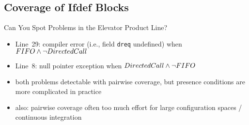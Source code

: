 \subsection{Coverage of Ifdef Blocks}
\begin{frame}[b]
	\begin{example}{Can You Spot Problems in the Elevator Product Line?\mysource{\samplingsurvey}}
		\centering{}
	\end{example}
	\pause
	\begin{itemize}
		\item<+-> Line~29: compiler error (i.e., field \texttt{dreq} undefined) %
		when $FIFO \wedge \neg DirectedCall$
		\item<+-> Line~8: null pointer exception %
		when $DirectedCall \wedge \neg FIFO$
		\item<+-> both problems detectable with pairwise coverage, but presence conditions are more complicated in practice
		\item<+-> also: pairwise coverage often too much effort for large configuration spaces / continuous integration
	\end{itemize}
\end{frame}

